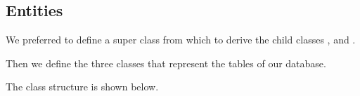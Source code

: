 \subsection{Entities}

We preferred to define a super class  from which to
derive the child classes ,  and .



Then we define the three classes that represent the tables of our database.

The class structure is shown below.



\newpage



\newpage


